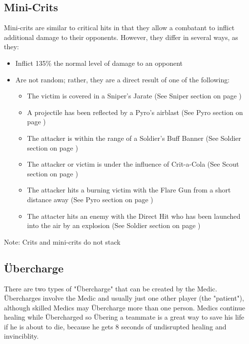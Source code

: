 \subsection{Mini-Crits}
Mini-crits are similar to critical hits in that they allow a combatant to inflict additional damage to their opponents.  However, they differ in several ways, as they:
\begin{itemize}
	\item Inflict 135\% the normal level of damage to an opponent
	\item Are not random; rather, they are a direct result of one of the following:
		\begin{itemize}
			\item The victim is covered in a Sniper's Jarate (See Sniper section on page \pageref{Sniper})
			\item A projectile has been reflected by a Pyro's airblast (See Pyro section on page \pageref{Pyro})
			\item The attacker is within the range of a Soldier's Buff Banner (See Soldier section on page \pageref{Soldier})
			\item The attacker or victim is under the influence of Crit-a-Cola (See Scout section on page \pageref{Scout})
			\item The attacker hits a burning victim with the Flare Gun from a short distance away (See Pyro section on page \pageref{Pyro})
			\item The attacter hits an enemy with the Direct Hit who has been launched into the air by an explosion (See Soldier section on page \pageref{Soldier})
		\end{itemize}
\end{itemize}
Note: Crits and mini-crits do not stack

\newpage

\subsection{Übercharge}
\label{Ubercharge}
There are two types of "Übercharge" that can be created by the Medic. Übercharges involve the Medic and usually just one other player (the "patient"), although skilled Medics may Übercharge more than one person.  Medics continue healing while Übercharged so Übering a teammate is a great way to save his life if he is about to die, because he gets 8 seconds of undisrupted healing and invinciblity.


